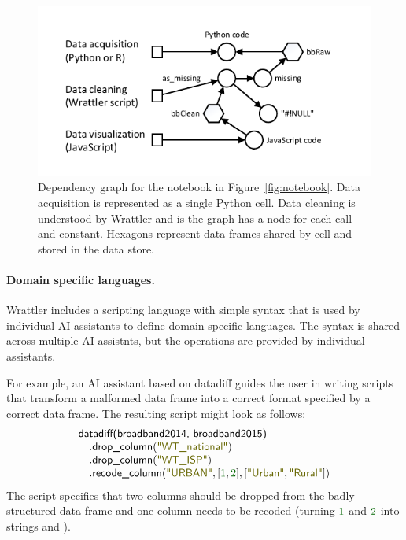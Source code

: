 \documentclass[sigplan,preprint,10pt]{acmart}\settopmatter{printfolios=true,printccs=false,printacmref=false}
\theoremstyle{plain}
\theoremstyle{definition}
\newcommand{\num}[1]{\textcolor{numclr}{#1}}
\newcommand{\str}[1]{\textnormal{\textcolor{strclr}{\sffamily "#1"}}}
\newcommand{\ident}[1]{\textnormal{\sffamily #1}}
\begin{document}
{\begin{figure}
\includegraphics[scale=1,trim=0.5cm 0.5cm 0.5cm 0.5cm]{graph.pdf}

\caption{\small{Dependency graph for the notebook in Figure~\ref{fig:notebook}.
Data acquisition is represented as a single Python cell. Data cleaning is understood
by Wrattler and is the graph has a node for each call and constant. Hexagons represent
data frames shared by cell and stored in the data store.}}
\label{fig:deps}
\vspace{-0.5em}
\end{figure}

\paragraph{Domain specific languages.}

Wrattler includes a scripting language with simple syntax that is used by individual AI assistants
to define domain specific languages. The syntax is shared across multiple AI assistnts, but the
operations are provided by individual assistants.

For example, an AI assistant based on datadiff
guides the user in writing scripts that transform a malformed data frame into a correct format
specified by a correct data frame. The resulting script might look as follows:
%
\begin{equation*}
\begin{array}{l}
\ident{datadiff(broadband2014, broadband2015)}\\
\quad.\ident{drop\_column}(\str{WT\_national})\\
\quad.\ident{drop\_column}(\str{WT\_ISP})\\
\quad.\ident{recode\_column}(\str{URBAN}, [\num{1}, \num{2}], [\str{Urban},\str{Rural}])
\end{array}
\end{equation*}
%
The script specifies that two columns should be dropped from the badly structured data frame and
one column needs to be recoded (turning $\num{1}$ and $\num{2}$ into strings
 and ).

}
\end{document}
